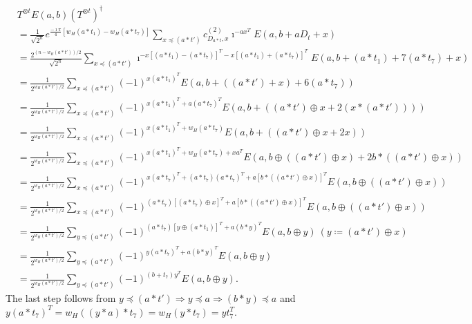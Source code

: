 \documentclass[twoside,romanappendices]{IEEEtran}
\begin{document}
\begin{align}
& T^{\otimes t} E(a,b) \left( T^{\otimes t} \right)^{\dagger} \nonumber \\
%
 & = \frac{1}{\sqrt{2^n}} e^{\frac{-\imath\pi}{4} \left[ w_H(a \ast t_1) - w_H(a \ast t_7) \right]} \sum_{x \preceq (a \ast t')} c_{D_{a \ast t},x}^{(2)} \imath^{-a x^T} E(a, b + aD_t + x) \\
%
  & = \frac{2^{\left( n - w_H(a \ast t') \right)/2}}{\sqrt{2^n}} \sum_{x \preceq (a \ast t')} \imath^{-x \left[ (a \ast t_1) - (a \ast t_7) \right]^T - x \left[ (a \ast t_1) + (a \ast t_7) \right]^T} E(a, b + (a \ast t_1) + 7 (a \ast t_7) + x) \\
%
  & = \frac{1}{2^{w_H(a \ast t')/2}} \sum_{x \preceq (a \ast t')}  (-1)^{x (a \ast t_1)^T} E(a, b + ((a \ast t') + x) + 6 (a \ast t_7) ) \\
%
  & = \frac{1}{2^{w_H(a \ast t')/2}} \sum_{x \preceq (a \ast t')}  (-1)^{x (a \ast t_1)^T + a (a \ast t_7)^T} E\left( a, b + \left( (a \ast t') \oplus x + 2 (x \ast (a \ast t')) \right) \right) \\
%
  & = \frac{1}{2^{w_H(a \ast t')/2}} \sum_{x \preceq (a \ast t')}  (-1)^{x (a \ast t_1)^T + w_H(a \ast t_7)} E\left( a, b + \left( (a \ast t') \oplus x + 2 x \right) \right) \\
%
  & = \frac{1}{2^{w_H(a \ast t')/2}} \sum_{x \preceq (a \ast t')}  (-1)^{x (a \ast t_1)^T + w_H(a \ast t_7) + xa^T} E\left( a, b \oplus \left( (a \ast t') \oplus x \right) + 2 b \ast ((a \ast t') \oplus x) \right) \\
%
  & = \frac{1}{2^{w_H(a \ast t')/2}} \sum_{x \preceq (a \ast t')}  (-1)^{x (a \ast t_7)^T + (a \ast t_7) (a \ast t_7)^T + a \left[ b \ast ((a \ast t') \oplus x) \right]^T} E\left( a, b \oplus \left( (a \ast t') \oplus x \right) \right) \\
%
  & = \frac{1}{2^{w_H(a \ast t')/2}} \sum_{x \preceq (a \ast t')}  (-1)^{(a \ast t_7) \left[(a \ast t_7) \oplus x \right]^T + a \left[ b \ast ((a \ast t') \oplus x) \right]^T} E\left( a, b \oplus \left( (a \ast t') \oplus x \right) \right) \\
%
  & = \frac{1}{2^{w_H(a \ast t')/2}} \sum_{y \preceq (a \ast t')}  (-1)^{(a \ast t_7) \left[y \oplus (a \ast t_1) \right]^T + a ( b \ast y )^T} E\left( a, b \oplus y \right) \ (y \coloneqq (a \ast t') \oplus x) \\
%
  & = \frac{1}{2^{w_H(a \ast t')/2}} \sum_{y \preceq (a \ast t')}  (-1)^{y(a \ast t_7)^T + a ( b \ast y )^T} E\left( a, b \oplus y \right) \\
%
  & = \frac{1}{2^{w_H(a \ast t')/2}} \sum_{y \preceq (a \ast t')}  (-1)^{(b + t_7) y^T} E\left( a, b \oplus y \right).
\end{align}
The last step follows from $y \preceq (a \ast t') \Rightarrow y \preceq a \Rightarrow (b \ast y) \preceq a$ and $y(a \ast t_7)^T = w_H((y \ast a) \ast t_7) = w_H(y \ast t_7) = y t_7^T$.  \hfill \IEEEQEDhere
\end{document}
